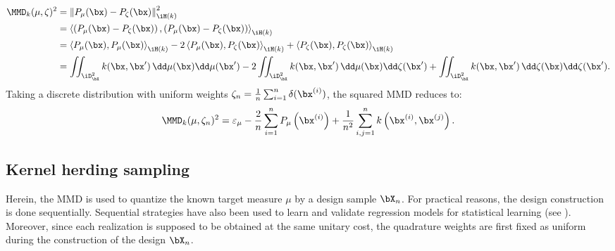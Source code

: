 \begin{subequations}
\begin{align}\label{eq:mmd2}
    \MMD_k(\mu, \zeta)^2 &= \left\lVert P_{\mu}(\bx) - P_{\zeta}(\bx) \right\lVert^2_{\iH(k)}\\
        &= \left\langle \left(P_{\mu}(\bx) - P_{\zeta}(\bx) \right), \left(P_{\mu}(\bx) - P_{\zeta}(\bx) \right) \right\rangle_{\iH(k)}\\
        &= \left\langle P_{\mu}(\bx), P_{\mu}(\bx) \right\rangle_{\iH(k)} - 2 \left\langle P_{\mu}(\bx), P_{\zeta}(\bx) \right\rangle_{\iH(k)} + \left\langle P_{\zeta}(\bx), P_{\zeta}(\bx) \right\rangle_{\iH(k)}\\
        &= \iint_{\iD_{\bX}^2} k(\bx, \bx')\, \dd\mu(\bx) \dd\mu(\bx') - 2 \iint_{\iD_{\bX}^2} k(\bx, \bx')\, \dd\mu(\bx) \dd\zeta(\bx') + \iint_{\iD_{\bX}^2} k(\bx, \bx')\, \dd\zeta(\bx) \dd\zeta(\bx').
\end{align}
\end{subequations}
Taking a discrete distribution with uniform weights $\zeta_n= \frac{1}{n} \sum_{i=1}^{n} \delta(\bx^{(i)})$, the squared MMD reduces to: 
\begin{equation}\label{eq:mmd_design}
    \MMD_k(\mu, \zeta_n)^2 = \varepsilon_\mu - \frac{2}{n} \sum_{i=1}^n P_{\mu}\left(\bx^{(i)}\right) + \frac{1}{n^2} \sum_{i, j=1}^n k\left(\bx^{(i)}, \bx^{(j)}\right).
\end{equation}

\subsection{Kernel herding sampling}\label{sec:4khsubsec}
Herein, the MMD is used to quantize the known target measure $\mu$ by a design sample $\bX_n$. 
For practical reasons, the design construction is done sequentially. 
Sequential strategies have also been used to learn and validate regression models for statistical learning (see \cite{fekhari_iooss_2023}). 
Moreover, since each realization is supposed to be obtained at the same unitary cost, the quadrature weights are first fixed as uniform during the construction of the design $\bX_n$.

